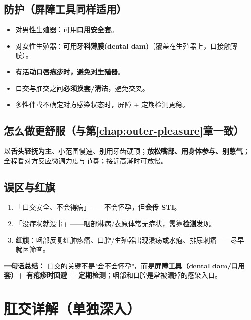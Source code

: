 \documentclass[12pt,UTF8,openany]{ctexbook}
\begin{document}
\section{防护（屏障工具同样适用）}

\begin{itemize}[leftmargin=2em,itemsep=0.3em]
  \item 对男性生殖器：可用\textbf{口用安全套}。
  \item 对女性生殖器：可用\textbf{牙科薄膜(dental dam)}（覆盖在生殖器上，口接触薄膜）。
  \item \textbf{有活动口唇疱疹时，避免对生殖器}。
  \item 口交与肛交之间\textbf{必须换套/清洁}，避免交叉。
  \item 多性伴或不确定对方感染状态时，屏障 + 定期检测更稳。
\end{itemize}

\section{怎么做更舒服（与第\ref{chap:outer-pleasure}章一致）}

以\textbf{舌头轻抚为主}、小范围慢速、别用牙齿硬顶；\textbf{放松嘴部、用身体参与、别憋气}；全程看对方反应微调力度与节奏；接近高潮时可放慢。

\section{误区与红旗}

\begin{enumerate}[leftmargin=2em,itemsep=0.3em]
  \item 「口交安全、不会得病」——不会怀孕，但\textbf{会传 STI}。
  \item 「没症状就没事」——咽部淋病/衣原体常无症状，需靠\textbf{检测}发现。
  \item \textbf{红旗}：咽部反复红肿疼痛、口腔/生殖器出现溃疡或水疱、排尿刺痛——尽早就医筛查。
\end{enumerate}

\vspace{1em}
\noindent\textbf{一句话总结：} 口交的关键不是"会不会怀孕"，而是\textbf{屏障工具（dental dam/口用套）+ 有疱疹时回避 + 定期检测}；咽部和口腔是常被漏掉的感染入口。

\chapter{肛交详解（单独深入）}
\label{chap:anal}
\end{document}
